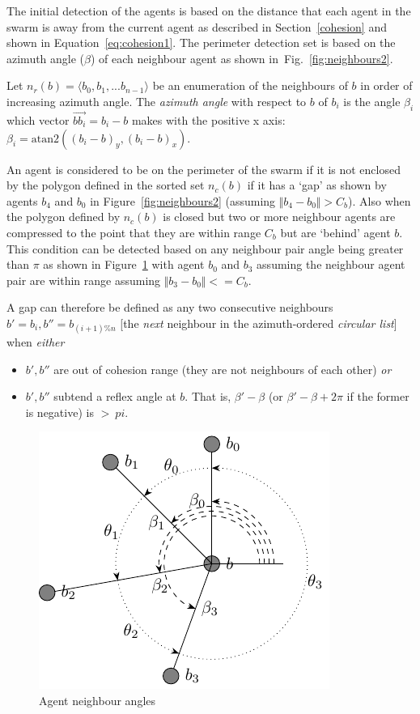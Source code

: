 \documentclass[12pt,a4paper]{IEEEtran}
\newcommand{\magn}[1]{\Vert{#1}\Vert}
\newcommand{\vbb}[2]{#2-#1}
\begin{document}
The initial detection of the agents is based on the distance that each agent in the swarm is away from the current agent as described in Section~\ref{cohesion} and shown in Equation~\ref{eq:cohesion1}. The perimeter detection set is based on the azimuth angle ($\beta$) of each neighbour agent as shown in~Fig.~\ref{fig:neighbours2}.

Let $n_r(b) = \langle b_0, b_1, ... b_{n-1} \rangle$ be an enumeration of the neighbours of $b$ in order of increasing azimuth angle. The \emph{azimuth angle} with respect to $b$ of $b_i$ is the angle $\beta_i$ which vector $\vec{bb_i} = b_i - b$ makes with the positive x axis: $\beta_i = \text{atan2}((b_i - b)_y, (b_i - b)_x)$.

An agent is considered to be on the perimeter of the swarm if it is not enclosed by the polygon defined in the sorted set $n_c(b)$ if it has a `gap' as shown by agents $b_4$ and $b_0$ in Figure~\ref{fig:neighbours2} (assuming $\magn{\vbb{b_0}{b_4}} > C_b$). Also when the polygon defined by $n_c(b)$ is closed but two or more neighbour agents are compressed to the point that they are within range $C_b$ but are `behind' agent $b$. This condition can be detected based on any neighbour pair angle being greater than $\pi$ as shown in Figure~\ref{fig:neighbours3} with agent $b_0$ and $b_3$ assuming the neighbour agent pair are within range assuming $\magn{\vbb{b_0}{b_3}} <= C_b$. 


A gap can therefore be defined as any two consecutive neighbours $b' = b_i, b'' = b_{(i+1)\%n}$ [the \emph{next} neighbour in the azimuth-ordered \emph{circular list}] when \emph{either}
\begin{itemize}
	\item $b', b''$ are out of cohesion range (they are not neighbours of each other) \emph{or}
	\item $b', b''$ subtend a reflex angle at $b$. That is, $\beta' - \beta$ (or $\beta' - \beta + 2\pi$ if the former is negative) is $> \ pi$.
\end{itemize} 

\begin{figure}[H]
	\centering
	\includegraphics[width=0.8\linewidth]{figures/neighbours3}
	\caption[Agent neighbours]{Agent neighbour angles}
	\label{fig:neighbours3}
\end{figure}
\end{document}
